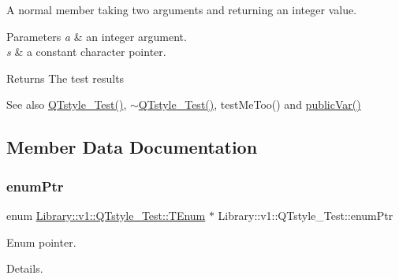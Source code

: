 A normal member taking two arguments and returning an integer value. 


\begin{DoxyParams}{Parameters}
{\em a} & an integer argument. \\
\hline
{\em s} & a constant character pointer. \\
\hline
\end{DoxyParams}
\begin{DoxyReturn}{Returns}
The test results 
\end{DoxyReturn}
\begin{DoxySeeAlso}{See also}
\mbox{\hyperlink{class_library_1_1v1_1_1_q_tstyle___test_ae7bab88d8f1eaa93d8e39f2e1f06b00e}{Q\+Tstyle\+\_\+\+Test()}}, \mbox{\hyperlink{class_library_1_1v1_1_1_q_tstyle___test_a418dfdd3063f4cc861dda19ff1e5864b}{$\sim$\+Q\+Tstyle\+\_\+\+Test()}}, test\+Me\+Too() and \mbox{\hyperlink{class_library_1_1v1_1_1_q_tstyle___test_aeaa1f30fff77bfdd45cda39f6b059fc0}{public\+Var()}} 
\end{DoxySeeAlso}


\subsection{Member Data Documentation}
\mbox{\label{class_library_1_1v1_1_1_q_tstyle___test_a84eea9c54a172dd84152d7435837d040}} 
\subsubsection{\texorpdfstring{enum\+Ptr}{enumPtr}}
{\footnotesize\ttfamily enum \mbox{\hyperlink{class_library_1_1v1_1_1_q_tstyle___test_ac4bc26cc9920a5addfcea6c9f88e10bf}{Library\+::v1\+::\+Q\+Tstyle\+\_\+\+Test\+::\+T\+Enum}}
                $\ast$ Library\+::v1\+::\+Q\+Tstyle\+\_\+\+Test\+::enum\+Ptr}



Enum pointer. 

Details. \mbox{\label{class_library_1_1v1_1_1_q_tstyle___test_a4d6b8e15ccca6defc857c9422d51248f}} 
